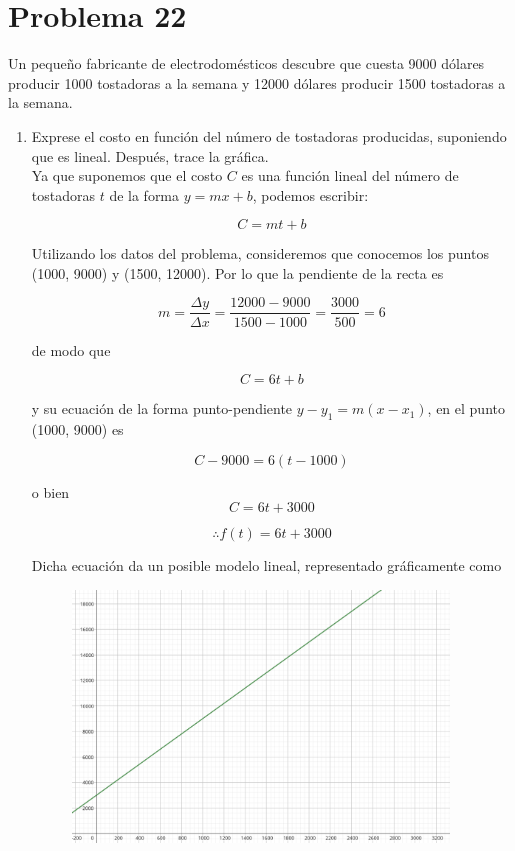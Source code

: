 \documentclass[12pt]{article}
\begin{document}
\section{Problema 22}
Un pequeño fabricante de electrodomésticos descubre que cuesta 9000 dólares producir 1000 tostadoras a la semana y 12000 dólares producir 1500 tostadoras a la semana.
\begin{enumerate}
\item Exprese el costo en función del número de tostadoras producidas, suponiendo que es lineal. Después, trace la gráfica.\\ 

Ya que suponemos que el costo $C$ es una función lineal del número de tostadoras $t$ de la forma $y = mx + b$, podemos escribir:

\[
	C=mt+b
\]

Utilizando los datos del problema, consideremos que conocemos los puntos (1000, 9000) y (1500, 12000). Por lo que la pendiente de la recta es

\[
	 m = \frac{\Delta {y}}{\Delta{x}} = \frac{12000-9000}{1500-1000} = \frac{3000}{500} = 6
\]

de modo que

\[
C=6t+b
\]

y su ecuación de la forma punto-pendiente $y-y_1=m(x-x_1)$, en el punto (1000, 9000) es 

\[
	C-9000=6(t-1000)
\]

o bien
\[
	C=6t+3000
\]

\[
\therefore f(t) = 6t + 3000
\]

Dicha ecuación da un posible modelo lineal, representado gráficamente como
\begin{figure}[h!]
\centering
\includegraphics[width=10cm]{img/tostadoras.png}
\end{figure}


\end{enumerate}
\end{document}
